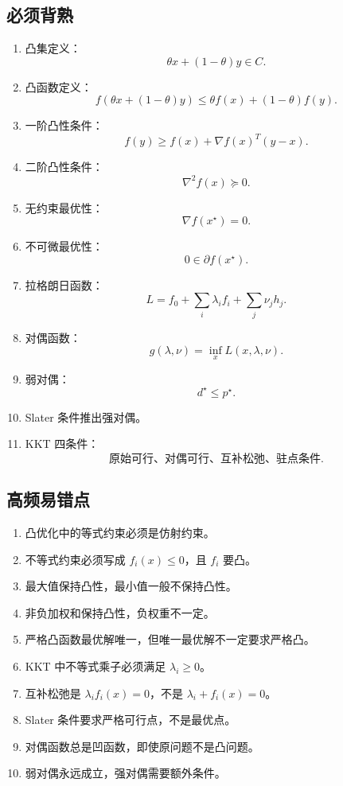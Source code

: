 \documentclass[11pt,a4paper]{ctexart}
\theoremstyle{definition}
\theoremstyle{plain}
\theoremstyle{remark}
\begin{document}
\subsection*{必须背熟}

\begin{enumerate}
    \item 凸集定义：
    \[
        \theta x+(1-\theta)y\in C.
    \]
    \item 凸函数定义：
    \[
        f(\theta x+(1-\theta)y)
        \le
        \theta f(x)+(1-\theta)f(y).
    \]
    \item 一阶凸性条件：
    \[
        f(y)\ge f(x)+\nabla f(x)^T(y-x).
    \]
    \item 二阶凸性条件：
    \[
        \nabla^2 f(x)\succeq0.
    \]
    \item 无约束最优性：
    \[
        \nabla f(x^\star)=0.
    \]
    \item 不可微最优性：
    \[
        0\in\partial f(x^\star).
    \]
    \item 拉格朗日函数：
    \[
        L=f_0+\sum_i\lambda_i f_i+\sum_j\nu_j h_j.
    \]
    \item 对偶函数：
    \[
        g(\lambda,\nu)=\inf_x L(x,\lambda,\nu).
    \]
    \item 弱对偶：
    \[
        d^\star\le p^\star.
    \]
    \item Slater 条件推出强对偶。
    \item KKT 四条件：
    \[
        \text{原始可行、对偶可行、互补松弛、驻点条件}.
    \]
\end{enumerate}

\subsection*{高频易错点}

\begin{enumerate}
    \item 凸优化中的等式约束必须是仿射约束。
    \item 不等式约束必须写成 $f_i(x)\le0$，且 $f_i$ 要凸。
    \item 最大值保持凸性，最小值一般不保持凸性。
    \item 非负加权和保持凸性，负权重不一定。
    \item 严格凸函数最优解唯一，但唯一最优解不一定要求严格凸。
    \item KKT 中不等式乘子必须满足 $\lambda_i\ge0$。
    \item 互补松弛是 $\lambda_i f_i(x)=0$，不是 $\lambda_i+f_i(x)=0$。
    \item Slater 条件要求严格可行点，不是最优点。
    \item 对偶函数总是凹函数，即使原问题不是凸问题。
    \item 弱对偶永远成立，强对偶需要额外条件。
\end{enumerate}
\end{document}
